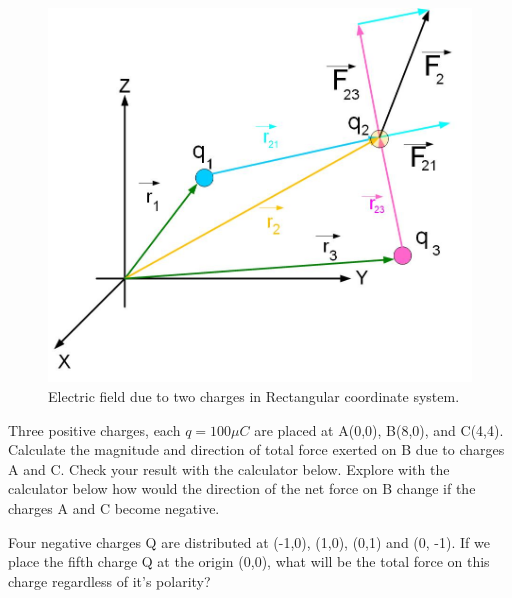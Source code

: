 \documentclass{ximera}
\begin{document}
\begin{example}
\begin{explanation}
\begin{figure}[htbp]
\begin{center}
\includegraphics[scale=0.5]{../jpg/twochargescartcoordFORCE.jpg}
\end{center}
\caption{Electric field due to two charges in  Rectangular coordinate system.}
\label{threecharges}
\end{figure}

\end{explanation}
\end{example}

\begin{problem}

Three positive charges, each $q=100\mu C$ are placed at A(0,0), B(8,0), and C(4,4). Calculate the magnitude and direction of total force exerted on B due to charges A and C. Check your result with the calculator below. Explore with the calculator below how would the direction of the net force on B change if the charges A and C become negative. 
\begin{center}
\end{center}

\end{problem}


\begin{question}  
  Four negative charges Q are distributed at (-1,0), (1,0), (0,1) and (0, -1). If we place the fifth charge Q at the origin (0,0), what will be the total force on this charge regardless of it's polarity?  
  \begin{multipleChoice}  
  \end{multipleChoice}  
\end{question}
\end{document}
